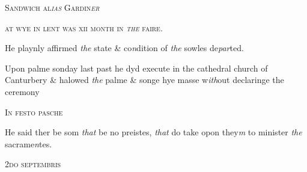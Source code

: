 \documentclass[12pt, a4paper]{book}
\begin{document}
            
            
            	
				\begin{center} \begin{large} {\scshape Sandwich al\textit{ias} Gardin\textit{er}
               } \end{large} \end{center}
			
               
                  
				\begin{center}  {\scshape  at wye in lent was
 xii month in \textit{the} faire.}  \end{center}
			


				\marginpar[\vspace{0.5cm}{\textcolor{Gray}{n+}}]{}
			
		\ifthenelse{\isodd{\thepage}}
		{\reversemarginpar}
		{\normalmarginpar}
		He playnly affirmed \textit{the} state \& co\textit{n}dition of \textit{the} sowles de\textit{par}ted.
 
				\marginpar[\vspace{0.5cm}{\textcolor{Gray}{ceremonies n}}]{}
			
		\ifthenelse{\isodd{\thepage}}
		{\reversemarginpar}
		{\normalmarginpar}
		Upon palme sonday last past
			 he dyd execute in the cathedral church of
 	Canturbery \& halowed \textit{the} palme \& songe hye masse w\textit{ith}out declaringe the ceremony
 

               
                  
				\begin{center}  {\scshape In festo pasche}  \end{center}
			

 
				\marginpar[\vspace{0.5cm}{\textcolor{Gray}{n}}]{}
			
		\ifthenelse{\isodd{\thepage}}
		{\reversemarginpar}
		{\normalmarginpar}
		He said ther be som \textit{that} be no preistes, \textit{that} do take opon they\textit{m} to
 minister \textit{the} sacrame\textit{n}tes.
 

               
                  
				\begin{center}  {\scshape 
                     2do septembris
                  }  \end{center}
			
\end{document}
